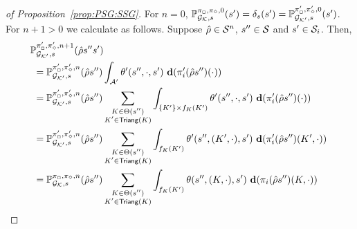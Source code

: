 \begin{proof}[of Proposition~\ref{prop:PSG:SSG}]
  For $n=0$,
  $\mathbb{P}^{\pi_{{\Box}},\pi_{{\Diamond}},0}_{{\mathcal{G}_{\mathcal{K}}},s}(s')=\delta_{s}(s')=\mathbb{P}^{\pi'_{{\Box}},\pi'_{{\Diamond}},0}_{{\mathcal{G}_{\mathcal{K}'}},s}(s')$.
  For $n+1>0$ we calculate as follows.  Suppose
  $\hat{\rho}\in\mathcal{S}^n$, $s''\in\mathcal{S}$ and $s'\in\mathcal{S}_{i}$.
  Then,
  \begin{align}
    &\!\!
    \Prob^{\strat'_{\maxplay},\strat'_{\minplay},n+1}_{\StochGKp,s}(\hat{\rho} s'' s')
    \notag\\
    & =
    \Prob^{\strat'_{\maxplay},\strat'_{\minplay},n}_{\StochGKp,s}(\hat{\rho}s'')\int_{\sgactions'}\sgtrans'(s'',\cdot,s')\ \diff(\strat'_{i}(\hat{\rho}s'')(\cdot))
    \label{eq:strat:ssg:prob:i}\\
    & =
    \Prob^{\strat'_{\maxplay},\strat'_{\minplay},n}_{\StochGKp,s}(\hat{\rho}s'')\sum_{\substack{K\in\psgtrans(s'')\\K'\in\Triang(K)}}\int_{\{K'\}\times f_K(K')}\sgtrans'(s'',\cdot,s')\ \diff(\strat'_{i}(\hat{\rho}s'')(\cdot))
    \label{eq:strat:ssg:prob:ii}\\
    & =
    \Prob^{\strat'_{\maxplay},\strat'_{\minplay},n}_{\StochGKp,s}(\hat{\rho}s'')\sum_{\substack{K\in\psgtrans(s'')\\K'\in\Triang(K)}}\int_{f_K(K')}\sgtrans'(s'',(K',\cdot),s')\ \diff(\strat'_{i}(\hat{\rho}s'')(K',\cdot))
    \label{eq:strat:ssg:prob:iii}\\
    & =
    \Prob^{\strat_{\maxplay},\strat_{\minplay},n}_{\StochGK,s}(\hat{\rho}s'')\sum_{\substack{K\in\psgtrans(s'')\\K'\in\Triang(K)}}\int_{f_K(K')}\sgtrans(s'',(K,\cdot),s')\ \diff(\strat_{i}(\hat{\rho}s'')(K,\cdot))

\end{align}
\end{proof}

